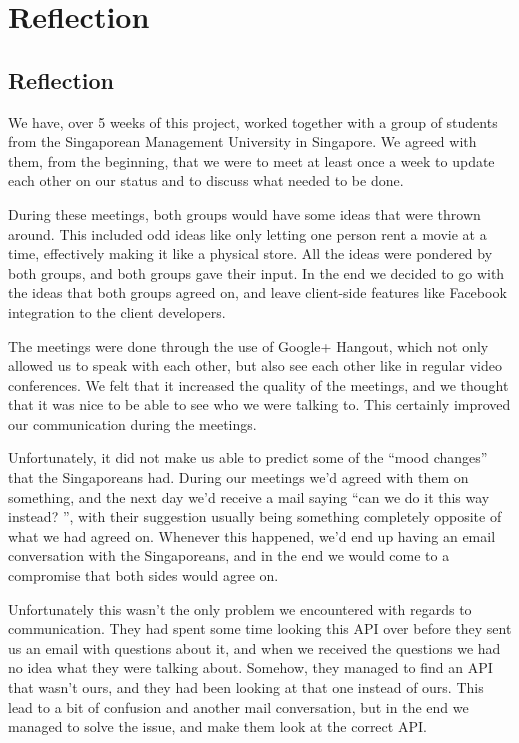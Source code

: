\documentclass[11pt, danish, a4paper, oneside]{report}
\begin{document}
\chapter{Reflection}
\section*{Reflection}
\label{reflection}
We have, over 5 weeks of this project, worked together with a group of students from the Singaporean Management University in Singapore. We agreed with them, from the beginning, that we were to meet at least once a week to update each other on our status and to discuss what needed to be done.

During these meetings, both groups would have some ideas that were thrown around. This included odd ideas like only letting one person rent a movie at a time, effectively making it like a physical store. All the ideas were pondered by both groups, and both groups gave their input. In the end we decided to go with the ideas that both groups agreed on, and leave client-side features like Facebook integration to the client developers.

The meetings were done through the use of Google+ Hangout, which not only allowed us to speak with each other, but also see each other like in regular video conferences. We felt that it increased the quality of the meetings, and we thought that it was nice to be able to see who we were talking to. This certainly improved our communication during the meetings.

Unfortunately, it did not make us able to predict some of the ``mood changes'' that the Singaporeans had. During our meetings we'd agreed with them on something, and the next day we'd receive a mail saying ``can we do it this way instead? '', with their suggestion usually being something completely opposite of what we had agreed on. Whenever this happened, we'd end up having an email conversation with the Singaporeans, and in the end we would come to a compromise that both sides would agree on.

Unfortunately this wasn't the only problem we encountered with regards to communication. They had spent some time looking this API over before they sent us an email with questions about it, and when we received the questions we had no idea what they were talking about. Somehow, they managed to find an API that wasn't ours, and they had been looking at that one instead of ours. This lead to a bit of confusion and another mail conversation, but in the end we managed to solve the issue, and make them look at the correct API.
\end{document}
